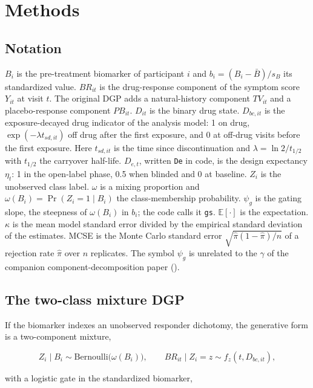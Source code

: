 \documentclass[
  11pt,
]{article}
\begin{document}
\section{Methods}\label{methods}

\subsection{Notation}\label{notation}

\(B_i\) is the pre-treatment biomarker of participant \(i\) and
\(b_i = (B_i - \bar B)/s_B\) its standardized value. \(BR_{it}\) is the
drug-response component of the symptom score \(Y_{it}\) at visit \(t\).
The original DGP adds a natural-history component \(TV_{it}\) and a
placebo-response component \(PB_{it}\). \(D_{it}\) is the binary drug
state. \(D_{bc,it}\) is the exposure-decayed drug indicator of the
analysis model: 1 on drug, \(\exp(-\lambda t_{sd,it})\) off drug after
the first exposure, and 0 at off-drug visits before the first
exposure. Here \(t_{sd,it}\) is the time since discontinuation and
\(\lambda = \ln 2 / t_{1/2}\) with \(t_{1/2}\) the carryover half-life.
\(D_{e,t}\), written \texttt{De} in code, is the design expectancy \(\eta_t\): 1
in the open-label phase, 0.5 when blinded and 0 at baseline. \(Z_i\) is
the unobserved class label. \(\omega\) is a mixing proportion and
\(\omega(B_i) = \Pr(Z_i = 1 \mid B_i)\) the class-membership
probability. \(\psi_g\) is the gating slope, the steepness of
\(\omega(B_i)\) in \(b_i\); the code calls it \texttt{gs}. \(\mathbb E[\cdot]\) is
the expectation. \(\kappa\) is the mean model standard error divided by
the empirical standard deviation of the estimates. MCSE is the Monte
Carlo standard error \(\sqrt{\hat\pi(1-\hat\pi)/n}\) of a rejection
rate \(\hat\pi\) over \(n\) replicates. The symbol \(\psi_g\) is unrelated
to the \(\gamma\) of the companion component-decomposition paper
().

\subsection{The two-class mixture DGP}\label{the-two-class-mixture-dgp}

If the biomarker indexes an unobserved responder dichotomy, the
generative form is a two-component mixture,

\[
Z_i \mid B_i \sim \mathrm{Bernoulli}\bigl(\omega(B_i)\bigr), \qquad
BR_{it} \mid Z_i = z \sim f_z(t, D_{bc,it}),
\]

with a logistic gate in the standardized biomarker,
\end{document}
